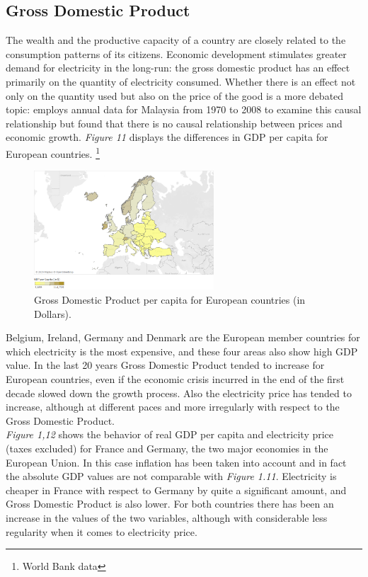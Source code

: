 \documentclass{book}
\begin{document}
\subsection{Gross Domestic Product}

The wealth and the productive capacity of a country are closely related to the consumption patterns of its citizens. Economic development stimulates greater demand for electricity in the long-run: the gross domestic product has an effect primarily on the quantity of electricity consumed. \cite{jamil2010relationship} Whether there is an effect not only on the quantity used but also on the price of the good is a more debated topic: \cite{lean2010multivariate} employs annual data for Malaysia from 1970 to 2008 to examine this causal relationship but found that there is no causal relationship between prices and economic growth. \textit{Figure 11} displays the differences in GDP per capita for European countries. \footnote{World Bank data}

\bigskip
\begin{figure}[H]
\begin{center}
\captionsetup{justification=centering}
\includegraphics[width=0.6\textwidth]{Images/gdp.png}
\caption{Gross Domestic Product per capita for European countries (in Dollars). }
\end{center}
\end{figure}
\bigskip

Belgium, Ireland, Germany and Denmark are the European member countries for which electricity is the most expensive, and these four areas also show high GDP value. In the last 20 years Gross Domestic Product tended to increase for European countries, even if the economic crisis incurred in the end of the first decade slowed down the growth process. Also the electricity price has tended to increase, although at different paces and more irregularly with respect to the Gross Domestic Product.\\

\textit{Figure 1,12} shows the behavior of real GDP per capita and electricity price (taxes excluded) for France and Germany, the two major economies in the European Union.  In this case inflation has been taken into account and in fact the absolute GDP values are not comparable with \textit{Figure 1.11}. Electricity is cheaper in France with respect to Germany by quite a significant amount, and Gross Domestic Product is also lower. For both countries there has been an increase in the values of the two variables, although with considerable less regularity when it comes to electricity price.
\end{document}
